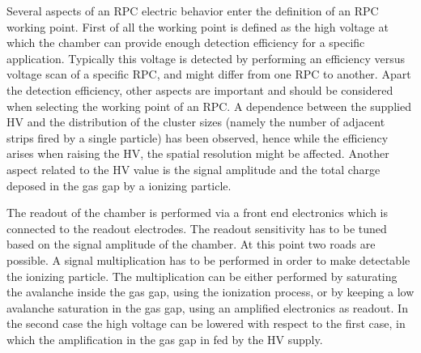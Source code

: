 Several aspects of an RPC electric behavior enter the definition of an RPC working point.
First of all the working point is defined as the high voltage at which the chamber can provide enough detection efficiency for a specific application.
Typically this voltage is detected by performing an efficiency versus voltage scan of a specific RPC, and might differ from one RPC to another.
Apart the detection efficiency, other aspects are important and should be considered when selecting the working point of an RPC.
A dependence between the supplied HV and the distribution of the cluster sizes (namely the number of adjacent strips fired by a single particle) has been observed, hence while the efficiency arises when raising the HV, the spatial resolution might be affected.
Another aspect related to the HV value is the signal amplitude and the total charge deposed in the gas gap by a ionizing particle.

The readout of the chamber is performed via a front end electronics which is connected to the readout electrodes.
The readout sensitivity has to be tuned based on the signal amplitude of the chamber.
At this point two roads are possible.
A signal multiplication has to be performed in order to make detectable the ionizing particle.
The multiplication can be either performed by saturating the avalanche inside the gas gap, using the ionization process, or by keeping a low avalanche saturation in the gas gap, using an amplified electronics as readout.
In the second case the high voltage can be lowered with respect to the first case, in which the amplification in the gas gap in fed by the HV supply.

